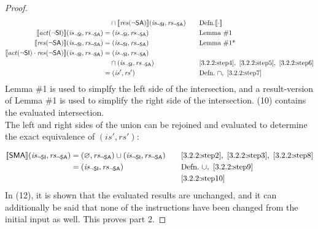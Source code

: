 \documentclass[12pt, letterpaper]{article}
\let\emptyset\varnothing
\newcommand\interp[1]{\llbracket #1 \rrbracket}
\begin{document}
\begin{proof}
{\begin{alignat}{2}
     &\quad \cap
     \interp{ \mathit{res}(\neg\mathsf{SA}) } (\mathit{is_{\mathsf{\neg SI}}}, \mathit{rs_{\mathsf{\neg SA}}})
     &&\quad \text{Defn.} \interp{\cdot}
     \\
     \label{3.2.2:step5}
     \interp{ \mathit{act}(\neg\mathsf{SI}) } (\mathit{is_{\mathsf{\neg SI}}}, \mathit{rs_{\mathsf{\neg SA}}})
     &=
     (\mathit{is_{\mathsf{\neg SI}}}, \mathit{rs_{\mathsf{\neg SA}}})
     &&\quad \text{Lemma \#1}
     \\
     \label{3.2.2:step6}
     \interp{ \mathit{res}(\neg\mathsf{SA}) } (\mathit{is_{\mathsf{\neg SI}}}, \mathit{rs_{\mathsf{\neg SA}}})
     &=
     (\mathit{is_{\mathsf{\neg SI}}}, \mathit{rs_{\mathsf{\neg SA}}})
     &&\quad \text{Lemma \#1*} %
     \\
     \label{3.2.2:step7}
     \interp{ \mathit{act}(\neg\mathsf{SI}) \cdot
      \mathit{res}(\neg\mathsf{SA}) } (\mathit{is_{\mathsf{\neg SI}}}, \mathit{rs_{\mathsf{\neg SA}}})
     &=
     (\mathit{is_{\mathsf{\neg SI}}}, \mathit{rs_{\mathsf{\neg SA}}})\\ \nonumber
     &\quad \cap
     (\mathit{is_{\mathsf{\neg SI}}}, \mathit{rs_{\mathsf{\neg SA}}})
     &&\quad \ref{3.2.2:step4},\ \ref{3.2.2:step5},\ \ref{3.2.2:step6}
     \\
     \label{3.2.2:step8}
     &=
     (\mathit{is}', \mathit{rs}')
     &&\quad \text{Defn.}\ \cap,\ \ref{3.2.2:step7}
 \end{alignat}
 }%
     Lemma \#1 is used to simplfy the left side of the intersection, and a result-version of Lemma \#1 is used to simplify the right side of the intersection. (10) contains the evaluated intersection.\\
     The left and right sides of the union can be rejoined and evaluated to determine the exact equivalence of $(\mathit{is}', \mathit{rs}')$:
 \par\nobreak
 {\fontsize{10pt}{12pt}\selectfont
 \begin{alignat}{2}
     \label{3.2.2:step9}
     \interp{ \mathsf{SMA} } (\mathit{is_{\mathsf{\neg SI}}}, \mathit{rs_{\mathsf{\neg SA}}})
     &=
     (\emptyset, \mathit{rs_{\mathsf{\neg SA}}}) \cup
     (\mathit{is_{\mathsf{\neg SI}}}, \mathit{rs_{\mathsf{\neg SA}}})
     &&\quad \ref{3.2.2:step2},\ \ref{3.2.2:step3},\ \ref{3.2.2:step8}
     \\
     \label{3.2.2:step10}
     &=
     (\mathit{is_{\mathsf{\neg SI}}}, \mathit{rs_{\mathsf{\neg SA}}})
     &&\quad \text{Defn.}\ \cup,\ \ref{3.2.2:step9}
     \\
     &\qedhere
     &&\quad \ref{3.2.2:step10}
 \end{alignat}
 }%
     In (12), it is shown that the evaluated results are unchanged, and it can additionally be said that none of the instructions have been changed from the initial input as well.  This proves part 2.
  \end{proof}
\end{document}
